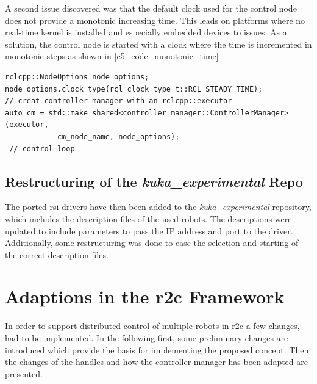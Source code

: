 A second issue discovered was that the default clock used for the control node does not provide a monotonic increasing time. This leads on platforms where no real-time kernel is installed and especially embedded devices to issues. As a solution, the control node is started with a clock where the time is incremented in monotonic steps as shown in \autoref{c5_code_monotonic_time}
\lstset{language=C++,basicstyle=\scriptsize}
\begin{lstlisting}[caption=Small code extract for setting monotonic clock.,label=c5_code_monotonic_time]
rclcpp::NodeOptions node_options;
node_options.clock_type(rcl_clock_type_t::RCL_STEADY_TIME);
// creat controller manager with an rclcpp::executor
auto cm = std::make_shared<controller_manager::ControllerManager>(executor,
            cm_node_name, node_options);
 // control loop
\end{lstlisting}

\subsection{Restructuring of the \textit{kuka\_experimental} Repo}
The ported \gls{rsi} drivers have then been added to the \textit{kuka\_experimental} repository, which includes the description files of the used robots. The descriptions were updated to include parameters to pass the IP address and port to the driver. Additionally, some restructuring was done to ease the selection and starting of the correct description files. 

\section{Adaptions in the \gls{r2c} Framework}
In order to support distributed control of multiple robots in \gls{r2c} a few changes, had to be implemented. In the following first, some preliminary changes are introduced which provide the basis for implementing the proposed concept. Then the changes of the handles and how the controller manager has been adapted are presented.


